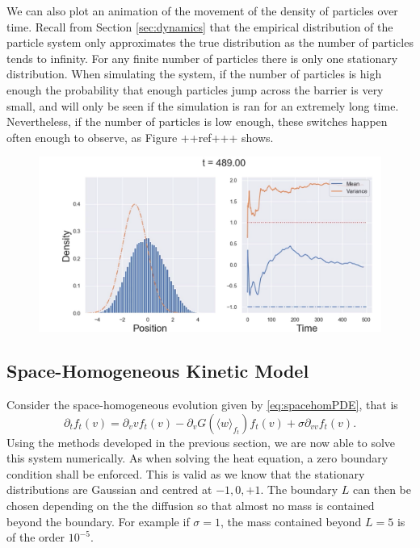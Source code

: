 We can also plot an animation of the movement of the density of particles over time. Recall from Section \ref{sec:dynamics} that the empirical distribution of the particle system only approximates the true distribution as the number of particles tends to infinity. For any finite number of particles there is only one stationary distribution. When simulating the system, if the number of particles is high enough the probability that enough particles jump across the barrier is very small, and will only be seen if the simulation is ran for an extremely long time. Nevertheless, if the number of particles is low enough, these switches happen often enough to observe, as Figure ++ref+++ shows. 

\begin{figure}
    \centering
    \includegraphics[width=\linewidth]{Figures/switch}
    \caption[Mean Zero Invariant Measure for the Particle System]{}
    \label{fig:switch}
\end{figure}

\subsection{Space-Homogeneous Kinetic Model}\label{sec:homkin}
 Consider the space-homogeneous evolution given by \eqref{eq:spacehomPDE}, that is
    \begin{equation}
    \partial_t f_t(v) = \partial_v vf_t(v) - \partial_v G(\langle w \rangle_{f_t})f_t(v) + \sigma \partial_{vv} f_t(v).
    \end{equation}
    Using the methods developed in the previous section, we are now able to solve this system numerically. As when solving the heat equation, a zero boundary condition shall be enforced. This is valid as we know that the stationary distributions are Gaussian and centred at $-1,0,+1$. The boundary $L$ can then be chosen depending on the the diffusion so that almost no mass is contained beyond the boundary. For example if $\sigma = 1$, the mass contained beyond $L=5$ is of the order $10^{-5}$. 
    

